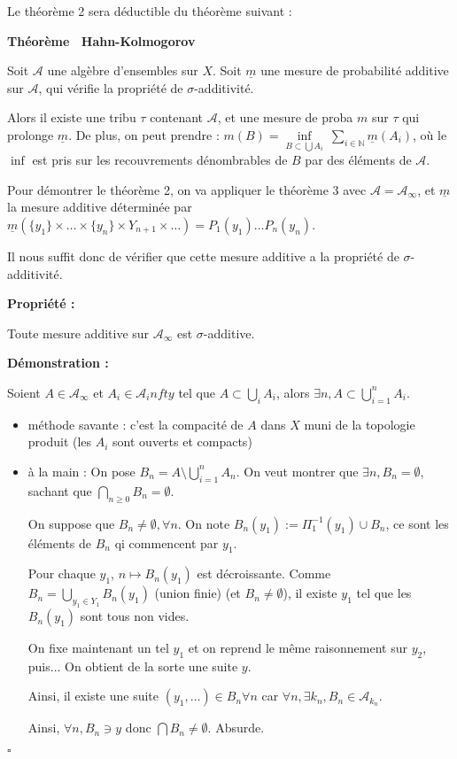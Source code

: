 \documentclass[10pt,a4paper,notitlepage ]{report}
\newcommand{\1}{\mathds 1}
\newcounter{th}
\newenvironment{theorem}[1][]{
\refstepcounter{th}
\begin{tcolorbox}
	\textbf{Théorème \theth \ #1}
	
	
}{\end{tcolorbox}}
\newenvironment{propriete}[1][]{
	\begin{tcolorbox}
		\textbf{Propriété #1 : }
}
{\end{tcolorbox}}
\newenvironment{demo}[1][]{

	\textbf{Démonstration #1 :}
}{\begin{flushright}
	$\square$
\end{flushright}
}
\begin{document}
Le théorème 2 sera déductible du théorème suivant :
\begin{theorem}[Hahn-Kolmogorov]
	Soit $\mathcal A$ une algèbre d'ensembles sur $X$. Soit $\underline m$ une mesure de probabilité additive sur $\mathcal A$, qui vérifie la propriété de $\sigma$-additivité.
	
	Alors il existe une tribu $\tau$ contenant $\mathcal A$, et une mesure de proba $m$ sur $\tau$ qui prolonge $\underline m$. De plus, on peut prendre : $m(B) = \underset{B \subset \bigcup A_i} \inf \  \underset{i \in \mathbb N}{\sum} \underline m (A_i)$, où le $\inf$ est pris sur les recouvrements dénombrables de $B$ par des éléments de $\mathcal A$.
\end{theorem}

Pour démontrer le théorème 2, on va appliquer le théorème 3 avec $\mathcal A = \mathcal A_\infty$, et $\underline m$ la mesure additive déterminée par $\underline m (\{y_1\}\times \dots \times \{y_n\} \times Y_{n+1} \times \dots) = P_1(y_1) \dots P_n(y_n)$.

Il nous suffit donc de vérifier que cette mesure additive a la propriété de $\sigma$-additivité.

\begin{propriete}
	Toute mesure additive sur $\mathcal A_\infty$ est $\sigma$-additive.
\end{propriete}

\begin{demo}
	Soient $A \in \mathcal A_\infty$ et $A_i \in \mathcal A_infty$ tel que $A \subset \underset i \bigcup A_i$, alors $\exists n, A \subset \bigcup_{i=1}^n A_i$.
	
	\begin{itemize}
		\item méthode savante : c'est la compacité de $A$ dans $X$ muni de la topologie produit (les $A_i$ sont ouverts et compacts)
		\item à la main :
		On pose $B_n = A \setminus \bigcup_{i=1}^n A_n$. On veut montrer que $\exists n, B_n = \emptyset$, sachant que $\underset {n\ge 0}\bigcap B_n = \emptyset$.
		
		On suppose que $B_n \ne \emptyset, \forall n$. On note $B_n(y_1) := \Pi_1^{-1}(y_1) \cup B_n$, ce sont les éléments de $B_n$ qi commencent par $y_1$.
		
		Pour chaque $y_1$, $n \mapsto B_n(y_1)$ est décroissante. Comme $B_n = \underset {y_1 \in Y_1} \bigcup B_n(y_1)$ (union finie) (et $B_n \ne \emptyset$), il existe $y_1$ tel que les $B_n(y_1)$ sont tous non vides.
		
		On fixe maintenant un tel $y_1$ et on reprend le même raisonnement sur $y_2$, puis... On obtient de la sorte une suite $y$.
		
		Ainsi, il existe une suite $(y_1, \dots) \in B_n \forall n$ car $\forall n, \exists k_n, B_n\in\mathcal A_{k_n}$.
		
		Ainsi, $\forall n, B_n \ni y$ donc $\bigcap B_n \ne \emptyset$. Absurde.
	\end{itemize}
\end{demo}
\end{document}
